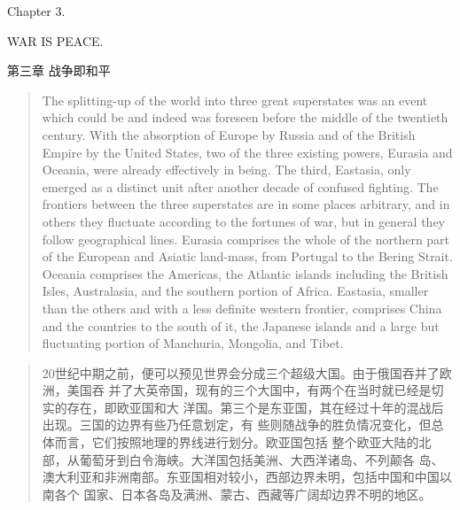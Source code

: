 \begin{paracol}{2}
\switchcolumn*

\begin{center}
Chapter 3.\par
WAR IS PEACE.
\end{center}

\switchcolumn

\begin{center}
第三章 战争即和平
\end{center}

\switchcolumn*

\begin{quotation}
The splitting-up of the world into three great superstates was an event
which could be and indeed was foreseen before the middle of the
twentieth century. With the absorption of Europe by Russia and of the
British Empire by the United States, two of the three existing powers,
Eurasia and Oceania, were already effectively in being. The third,
Eastasia, only emerged as a distinct unit after another decade of
confused fighting. The frontiers between the three superstates are in
some places arbitrary, and in others they fluctuate according to the
fortunes of war, but in general they follow geographical lines. Eurasia
comprises the whole of the northern part of the European and Asiatic
land-mass, from Portugal to the Bering Strait. Oceania comprises the
Americas, the Atlantic islands including the British Isles, Australasia,
and the southern portion of Africa. Eastasia, smaller than the others
and with a less definite western frontier, comprises China and the
countries to the south of it, the Japanese islands and a large but
fluctuating portion of Manchuria, Mongolia, and Tibet.
\end{quotation}

\switchcolumn

\begin{quotation}
20世纪中期之前，便可以预见世界会分成三个超级大国。由于俄国吞并了欧洲，美国吞
并了大英帝国，现有的三个大国中，有两个在当时就已经是切实的存在，即欧亚国和大
洋国。第三个是东亚国，其在经过十年的混战后出现。三国的边界有些乃任意划定，有
些则随战争的胜负情况变化，但总体而言，它们按照地理的界线进行划分。欧亚国包括
整个欧亚大陆的北部，从葡萄牙到白令海峡。大洋国包括美洲、大西洋诸岛、不列颠各
岛、澳大利亚和非洲南部。东亚国相对较小，西部边界未明，包括中国和中国以南各个
国家、日本各岛及满洲、蒙古、西藏等广阔却边界不明的地区。
\end{quotation}

\switchcolumn*


\end{paracol}
